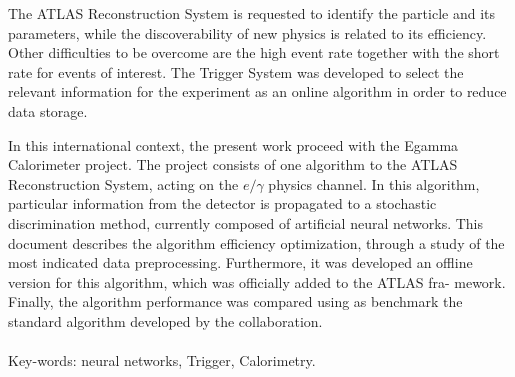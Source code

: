 The ATLAS Reconstruction System is requested to identify the particle and its
parameters, while the discoverability of new physics is related to its
efficiency. Other difficulties to be overcome are the high event rate together
with the short rate for events of interest. The Trigger System was developed to
select the relevant information for the experiment as an online algorithm in
order to reduce data storage.

In this international context, the present work proceed with the Egamma
Calorimeter project. The project consists of one algorithm to the 
ATLAS Reconstruction System, 
acting on the $e/\gamma$ physics channel. In this algorithm,
particular information from the detector is propagated to a stochastic
discrimination method, currently composed of artificial neural networks.
This document describes the algorithm efficiency optimization, through a study
of the most indicated data preprocessing. Furthermore, it was developed an
offline version for this algorithm, which was officially added to the ATLAS fra-
mework. Finally, the algorithm performance was compared using as benchmark the
standard algorithm developed by the collaboration.

\paragraph*{}

\noindent Key-words: neural networks, Trigger, Calorimetry.


\vfill
